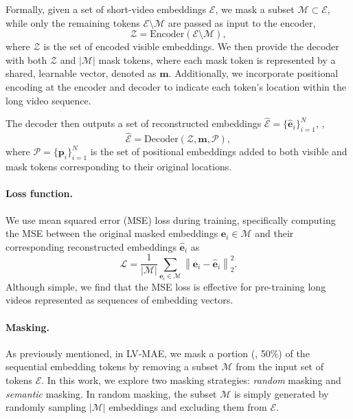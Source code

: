 Formally, given a set of short-video embeddings $\mathcal{E}$, we mask a subset $\mathcal{M} \subset \mathcal{E}$, while only the remaining tokens $\mathcal{E} \setminus \mathcal{M}$ are passed as input to the encoder,
\begin{equation} \label{eq:encoding}
    \mathcal{Z} = \text{Encoder}(\mathcal{E} \setminus \mathcal{M}),
\end{equation}
where $\mathcal{Z}$ is the set of encoded visible embeddings. 
We then provide the decoder with both $\mathcal{Z}$ and $|\mathcal{M}|$ mask tokens, where each mask token is represented by a shared, learnable vector, denoted as $\mathbf{m}$. Additionally, we incorporate positional encoding at the encoder and decoder to indicate each token's location within the long video sequence. 

The decoder then outputs a set of reconstructed embeddings $\hat{\mathcal{E}} = \{\hat{\mathbf{e}}_i\}_{i=1}^N$, \ie, 
\begin{equation}
    \hat{\mathcal{E}} = \text{Decoder}\left(\mathcal{Z}, \mathbf{m}, \mathcal{P}\right),
\end{equation}
where $\mathcal{P}=\{\mathbf{p}_i\}_{i=1}^N$ is the set of positional embeddings added to both visible and mask tokens corresponding to their original locations.

\vspace{-4mm}
\paragraph{Loss function.}
We use mean squared error (MSE) loss during training, specifically computing the MSE between the original masked embeddings $\mathbf{e}_i \in \mathcal{M}$ and their corresponding reconstructed embeddings $\hat{\mathbf{e}}_i$ as
\begin{equation}
    \mathcal{L} = \frac{1}{|\mathcal{M}|} \sum_{\mathbf{e}_i \in \mathcal{M}} \left\lVert \mathbf{e}_i - \hat{\mathbf{e}}_i \right\rVert_2^2.
\end{equation}
Although simple, we find that the MSE loss is effective for pre-training long videos represented as sequences of embedding vectors.

\vspace{-4mm}
\paragraph{Masking.}
As previously mentioned, in LV-MAE, we mask a portion (\eg, 50\%) of the sequential embedding tokens by removing a subset $\mathcal{M}$ from the input set of tokens $\mathcal{E}$. In this work, we explore two masking strategies: \textit{random} masking and \textit{semantic} masking. In random masking, the subset $\mathcal{M}$ is simply generated by randomly sampling $|\mathcal{M}|$ embeddings and excluding them from $\mathcal{E}$.


